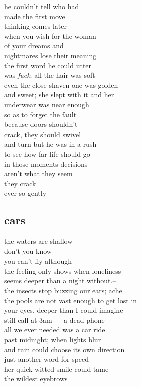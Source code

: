 \documentclass{article}
\begin{document}
he couldn't tell who had\\
made the first move\\
thinking comes later\\
when you wish for the woman\\
of your dreams and\\
nightmares lose their meaning\\
the first word he could utter\\
was \textit{fuck}; all the hair was soft\\
even the close shaven one was golden\\
and sweet; she slept with it and her\\
underwear was near enough\\
so as to forget the fault\\

because doors shouldn't\\
crack, they should swivel\\
and turn but he was in a rush\\
to see how far life should go\\
in those moments decisions\\
aren't what they seem\\
they crack\\
ever so gently
\clearpage



\subsection{cars}

the waters are shallow\\
don't you know\\
you can't fly although\\
the feeling only shows when loneliness\\
seems deeper than a  night without.-- \\
the insects stop buzzing our ears; ache\\
the pools are not vast enough to get lost in\\
your eyes, deeper than I could  imagine\\
still call at 3am --- a dead phone\\
all we ever needed was a car ride\\
past midnight; when lights blur\\
and rain  could choose its own direction\\
just another word for speed\\
her quick witted smile could tame\\
the wildest eyebrows\\
\end{document}

